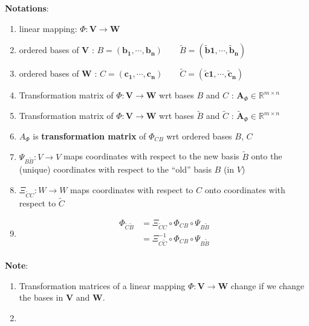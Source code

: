 \noindent\textbf{Notations}:
\begin{enumerate}
    \item linear mapping:  $\Phi : \mathbf{V \to W}$

    \item ordered bases of $\mathbf{V}$ : \(         \mathit{B} = \mathbf{(b_1, \cdots , b_n)} \quad\quad \tilde{\mathit{B}} = \mathbf{( \tilde{b}1, \cdots , \tilde{b}_n)}     \)

    \item ordered bases of $\mathbf{W}$ : \( \mathit{C} = \mathbf{(c_1, \cdots , c_n)} \quad\quad \tilde{\mathit{C}} = \mathbf{( \tilde{c}1, \cdots , \tilde{c}_n)} \)

    \item Transformation matrix of $\Phi: \mathbf{V} \to \mathbf{W}$ wrt bases $\mathit{B}$ and $\mathit{C}$ : $\mathbf{A}_\Phi \in \mathbb{R}^{m \times n}$

    \item Transformation matrix of $\Phi: \mathbf{V} \to \mathbf{W}$ wrt bases $\tilde{\mathit{B}}$ and $\tilde{\mathit{C}}$ : $\tilde{\mathbf{A}}_\Phi \in \mathbb{R}^{m \times n}$

    \item $A_\Phi$ is \textbf{transformation matrix} of $\Phi_{CB}$ wrt ordered bases $B$, $C$\\

    \item $\Psi_{B\tilde{B}} : V \to V$ maps coordinates with respect to the new basis $\tilde{B}$ onto the (unique) coordinates with respect to the “old” basis $B$ (in $V$)

    \item $\Xi_{\tilde{C}C} : W \to W$ maps coordinates with respect to $C$ onto coordinates with respect to $\tilde{C}$

    \item  \begin{align}
        \Phi_{\tilde{C}\tilde{B}}  
        &= \Xi_{\tilde{C}C} \circ \Phi_{CB} \circ \Psi_{B\tilde{B}} \\ 
        &= \Xi^{-1}_{C\tilde{C}} \circ \Phi_{CB} \circ \Psi_{B\tilde{B}} \\ 
    \end{align} 
    
\end{enumerate}

\vspace{0.2cm}
\noindent \textbf{Note}:
\begin{enumerate}
    \item Transformation matrices of a linear mapping $\Phi : \mathbf{V \to W}$ change if we change the bases in $\mathbf{V}$ and $\mathbf{W}$.

    \item 
\end{enumerate}

